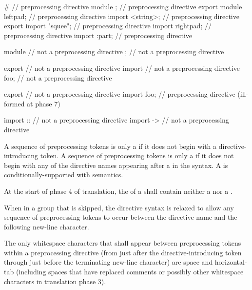 \begin{example}
\begin{codeblock}
#                       // preprocessing directive
module ;                // preprocessing directive
export module leftpad;  // preprocessing directive
import <string>;        // preprocessing directive
export import "squee";  // preprocessing directive
import rightpad;        // preprocessing directive
import :part;           // preprocessing directive

module                  // not a preprocessing directive
;                       // not a preprocessing directive

export                  // not a preprocessing directive
import                  // not a preprocessing directive
foo;                    // not a preprocessing directive

export                  // not a preprocessing directive
import foo;             // preprocessing directive (ill-formed at phase 7)

import ::               // not a preprocessing directive
import ->               // not a preprocessing directive
\end{codeblock}
\end{example}

\pnum
A sequence of preprocessing tokens is only a 
if it does not begin with a directive-introducing token.
A sequence of preprocessing tokens is only a 
if it does not begin with any of the directive names
appearing after a \tcode{\#} in the syntax.
A  is
conditionally-supported with
semantics.

\pnum
At the start of phase 4 of translation,
the  of a  shall
contain neither a  nor a .

\pnum
When in a group that is skipped, the directive
syntax is relaxed to allow any sequence of preprocessing tokens to occur between
the directive name and the following new-line character.

\pnum
The only whitespace characters that shall appear
between preprocessing tokens
within a preprocessing directive
(from just after the directive-introducing token
through just before the terminating new-line character)
are space and horizontal-tab
(including spaces that have replaced comments
or possibly other whitespace characters
in translation phase 3).


